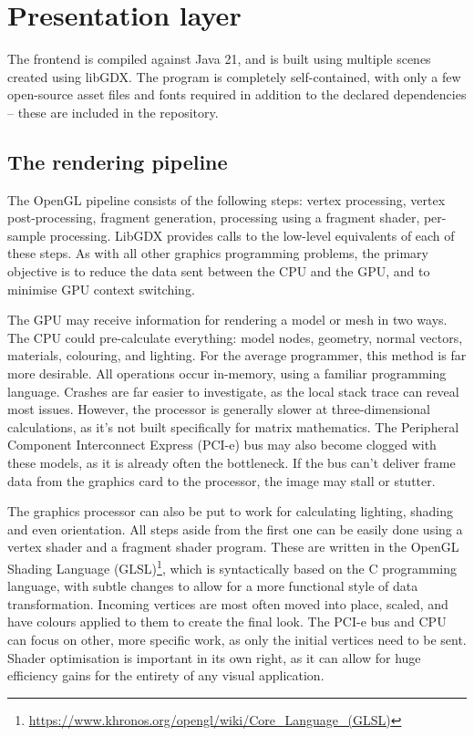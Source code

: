 \chapter{Presentation layer}

The frontend is compiled against Java 21, and is built using multiple scenes created using libGDX. The program is completely self-contained, with only a few open-source asset files and fonts required in addition to the declared dependencies -- these are included in the repository.

\section{The rendering pipeline}

The OpenGL pipeline consists of the following steps: vertex processing, vertex post-processing, fragment generation, processing using a fragment shader, per-sample processing\cite{OpenglPipeline}. LibGDX provides calls to the low-level equivalents of each of these steps. As with all other graphics programming problems, the primary objective is to reduce the data sent between the CPU and the GPU, and to minimise GPU context switching.

The GPU may receive information for rendering a model or mesh in two ways. The CPU could pre-calculate everything: model nodes, geometry, normal vectors, materials, colouring, and lighting. For the average programmer, this method is far more desirable. All operations occur in-memory, using a familiar programming language. Crashes are far easier to investigate, as the local stack trace can reveal most issues. However, the processor is generally slower at three-dimensional calculations, as it's not built specifically for matrix mathematics. The Peripheral Component Interconnect Express (PCI-e) bus may also become clogged with these models, as it is already often the bottleneck. If the bus can't deliver frame data from the graphics card to the processor, the image may stall or stutter.

The graphics processor can also be put to work for calculating lighting, shading and even orientation. All steps aside from the first one can be easily done using a vertex shader and a fragment shader program. These are written in the OpenGL Shading Language (GLSL)\footnote{\url{https://www.khronos.org/opengl/wiki/Core_Language_(GLSL)}}, which is syntactically based on the C programming language, with subtle changes to allow for a more functional style of data transformation. Incoming vertices are most often moved into place, scaled, and have colours applied to them to create the final look. The PCI-e bus and CPU can focus on other, more specific work, as only the initial vertices need to be sent. Shader optimisation is important in its own right, as it can allow for huge efficiency gains for the entirety of any visual application.

